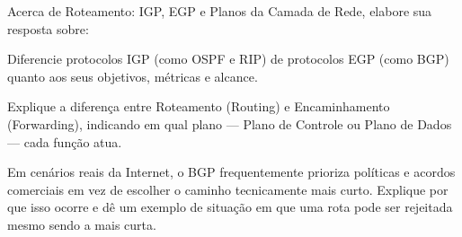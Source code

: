 \documentclass[11pt, addpoints]{modelo/prova2}
\begin{document}
\question[2.0] Acerca de Roteamento: IGP, EGP e Planos da Camada de Rede, elabore sua resposta sobre:
\begin{choices}
    \item Diferencie protocolos IGP (como OSPF e RIP) de protocolos EGP (como BGP) quanto aos seus objetivos, métricas e alcance.
    \item Explique a diferença entre Roteamento (Routing) e Encaminhamento (Forwarding), indicando em qual plano — Plano de Controle ou Plano de Dados — cada função atua.
    \item Em cenários reais da Internet, o BGP frequentemente prioriza políticas e acordos comerciais em vez de escolher o caminho tecnicamente mais curto. Explique por que isso ocorre e dê um exemplo de situação em que uma rota pode ser rejeitada mesmo sendo a mais curta. 
\end{choices}
\end{document}
